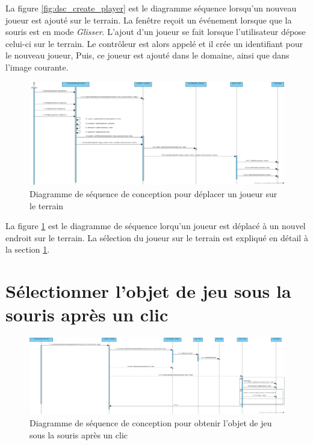 La figure \ref{fig:dsc_create_player} est le diagramme séquence lorsqu'un nouveau joueur est ajouté sur le terrain.
La fenêtre reçoit un événement lorsque que la souris est en mode \textit{Glisser}.
L'ajout d'un joueur se fait lorsque l'utilisateur dépose celui-ci sur le terrain.
Le contrôleur est alors appelé et il crée un identifiant pour le nouveau joueur,
Puis, ce joueur est ajouté dans le domaine, ainsi que dans l'image courante.


\begin{figure}[htpb]
    \centering
    \includegraphics[scale=0.3]{fig/dsc_drag_player.png}
    \caption{Diagramme de séquence de conception pour déplacer un joueur sur le terrain}
    \label{fig:dsc_drag_player}
\end{figure}

La figure \ref{fig:dsc_drag_player} est le diagramme de séquence lorqu'un joueur est déplacé à un nouvel endroit sur le terrain.
La sélection du joueur sur le terrain est expliqué en détail à la section \ref{sec:convertir_clic_en_objet}.

\section{Sélectionner l'objet de jeu sous la souris après un clic}
\label{sec:convertir_clic_en_objet}

\begin{figure}[htpb]
    \centering
    \includegraphics[scale=0.3]{fig/dsc_get_game_object_by_coordinate.png}
    \caption{Diagramme de séquence de conception pour obtenir l'objet de jeu sous la souris après un clic}
    \label{fig:dsc_get_game_object}
\end{figure}

